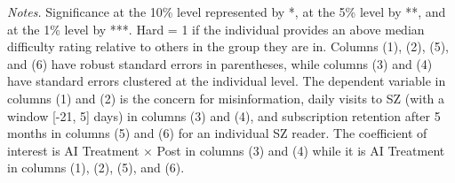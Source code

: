  \begin{table}[H]
 \centering
 \caption{Heterogeneous Effects: Quiz Difficulty}
 \label{tab:hard_hetero}
 {}
 \par
 \begin{minipage}{0.98\linewidth}
 \baselineskip9pt {\scriptsize \vspace{0.1cm} { \it Notes.} Significance at the 10\% level represented by *, at the 5\% level by **, and at the 1\% level by ***. Hard = 1 if the individual provides an above median difficulty rating relative to others in the group they are in. Columns (1), (2), (5), and (6) have robust standard errors in parentheses, while columns (3) and (4) have standard errors clustered at the individual level. The dependent variable in columns (1) and (2) is the concern for misinformation, daily visits to SZ (with a window [-21, 5] days) in columns (3) and (4), and subscription retention after 5 months in columns (5) and (6) for an individual SZ reader. The coefficient of interest is AI Treatment $\times$ Post in columns (3) and (4) while it is AI Treatment in columns (1), (2), (5), and (6).}
 \end{minipage}
 \end{table}

